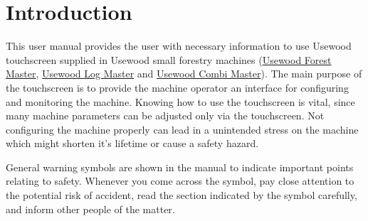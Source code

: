 \documentclass[12pt,a4paper,english]{uvmanual}
\begin{document}





\renewcommand\contentsname{Table of content}         %
\setcounter{tocdepth}{2}                      %
\tableofcontents                              %

\cleardoublepage

\newpage             %
\setcounter{page}{1} %
\renewcommand{\chaptername}{} %

\chapter{Introduction}

This user manual provides the user with necessary information to use Usewood touchscreen supplied in Usewood small forestry machines (\href{http://usewood.fi/index.php/en/small-harvesters/forest-master}{Usewood Forest Master}, \href{http://usewood.fi/index.php/en/small-harvesters/log-master-en}{Usewood Log Master} and \href{http://usewood.fi/index.php/en/small-harvesters/combi-master}{Usewood Combi Master}). The main purpose of the touchscreen is to provide the machine operator an interface for configuring and monitoring the machine. Knowing how to use the touchscreen is vital, since many machine parameters can be adjusted only via the touchscreen. Not configuring the machine properly can lead in a unintended stress on the machine which might shorten it's lifetime or cause a safety hazard.

{General warning symbols are shown in the manual to indicate important points relating to safety. Whenever you come across the symbol, pay close attention to the potential risk of accident, read the section indicated by the symbol carefully, and inform other people of the matter.}
\end{document}
